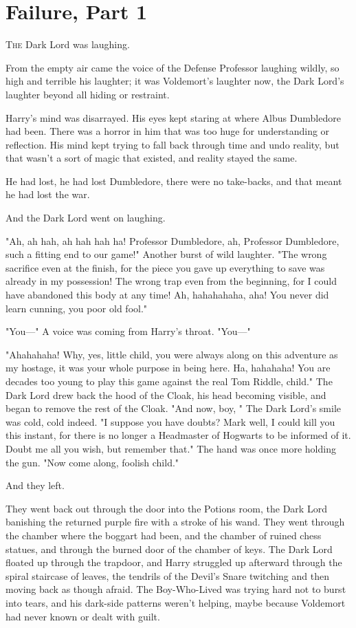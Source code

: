 \chapter{Failure, Part 1}

\lettrine{T}{he} Dark Lord was laughing.

From the empty air came the voice of the Defense Professor laughing wildly, so
high and terrible his laughter; it was Voldemort's laughter now, the Dark
Lord's laughter beyond all hiding or restraint.

Harry's mind was disarrayed. His eyes kept staring at where Albus Dumbledore
had been. There was a horror in him that was too huge for understanding or
reflection. His mind kept trying to fall back through time and undo reality,
but that wasn't a sort of magic that existed, and reality stayed the same.

He had lost, he had lost Dumbledore, there were no take-backs, and that meant
he had lost the war.

And the Dark Lord went on laughing.

"Ah, ah hah, ah hah hah ha! Professor Dumbledore, ah, Professor Dumbledore,
such a fitting end to our game!" Another burst of wild laughter. "The wrong
sacrifice even at the finish, for the piece you gave up everything to save was
already in my possession! The wrong trap even from the beginning, for I could
have abandoned this body at any time! Ah, hahahahaha, aha! You never did learn
cunning, you poor old fool."

"You---" A voice was coming from Harry's throat. "You---"

"Ahahahaha! Why, yes, little child, you were always along on this adventure as
my hostage, it was your whole purpose in being here. Ha, hahahaha! You are
decades too young to play this game against the real Tom Riddle, child." The
Dark Lord drew back the hood of the Cloak, his head becoming visible, and began
to remove the rest of the Cloak. "And now, boy, " The Dark Lord's smile was cold, cold indeed. "I suppose you have
doubts? Mark well, I could kill you this instant, for there is no longer a
Headmaster of Hogwarts to be informed of it. Doubt me all you wish, but
remember that." The hand was once more holding the gun. "Now come along,
foolish child."

And they left.

They went back out through the door into the Potions room, the Dark Lord
banishing the returned purple fire with a stroke of his wand. They went through
the chamber where the boggart had been, and the chamber of ruined chess
statues, and through the burned door of the chamber of keys. The Dark Lord
floated up through the trapdoor, and Harry struggled up afterward through the
spiral staircase of leaves, the tendrils of the Devil's Snare twitching and
then moving back as though afraid. The Boy-Who-Lived was trying hard not to
burst into tears, and his dark-side patterns weren't helping, maybe because
Voldemort had never known or dealt with guilt.

